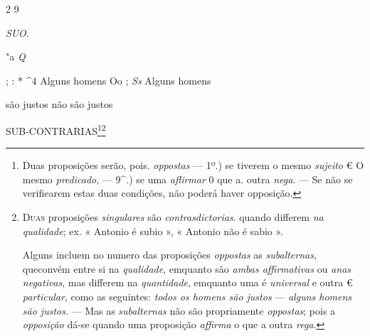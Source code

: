 2 9

\emph{SUO}.

"a \emph{Q}

; : * \textasciicircum{}4 Alguns homens Oo ; \emph{Ss} Alguns homens

são justos não são justos

SUB-CONTRARIAS\footnote{Duas proposições serão, pois. \emph{oppostas} --- 1º.) se tiverem o mesmo \emph{sujeito} € O mesmo \emph{predicado}, --- 9\textasciicircum{}.) se uma \emph{aflirmar} 0 que a. outra \emph{nega}. --- Se não se verifiearem estas duas condições, não poderá haver opposição.}\footnote{\textsc{Duas} proposições \emph{singulares} são \emph{contrasdictorias}. quando differem \emph{na qualidade}; ex. « Antonio é subio », « Antonio não é sabio ».\par Alguns incluem no numero das proposições \emph{oppostas} as \emph{subalternas}, queconvém entre si na \emph{qualidade}, emquanto são \emph{ambas affirmativas} ou \emph{anas negativas}, mas differem na \emph{quantidade}, emquanto uma é \emph{universal} e outra € \emph{particular}, como as seguintes: \emph{todos os homens são justos} --- \emph{alguns homens são justos}. --- Mas as \emph{subalternas} não são propriamente \emph{oppostas}; pois a \emph{opposição} dá-se quando uma proposição \emph{affirma} o que a outra \emph{rega}.}


 

